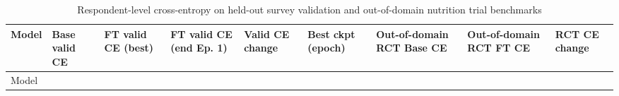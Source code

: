 \documentclass[
  letterpaper,
  DIV=11,
  numbers=noendperiod]{scrartcl}
\begin{document}
\begin{longtable}[]{@{}
  >{\raggedright\arraybackslash}p{}
  >{\raggedleft\arraybackslash}p{}
  >{\raggedleft\arraybackslash}p{}
  >{\raggedleft\arraybackslash}p{}
  >{\raggedleft\arraybackslash}p{}
  >{\raggedleft\arraybackslash}p{}
  >{\raggedleft\arraybackslash}p{}
  >{\raggedleft\arraybackslash}p{}
  >{\raggedleft\arraybackslash}p{}@{}}
\caption{Respondent-level cross-entropy on held-out survey validation
and out-of-domain nutrition trial
benchmarks}\label{tbl-validation}\tabularnewline
\toprule\noalign{}
\begin{minipage}[b]{\linewidth}\raggedright
Model
\end{minipage} & \begin{minipage}[b]{\linewidth}\raggedleft
Base valid CE
\end{minipage} & \begin{minipage}[b]{\linewidth}\raggedleft
FT valid CE (best)
\end{minipage} & \begin{minipage}[b]{\linewidth}\raggedleft
FT valid CE (end Ep. 1)
\end{minipage} & \begin{minipage}[b]{\linewidth}\raggedleft
Valid CE change
\end{minipage} & \begin{minipage}[b]{\linewidth}\raggedleft
Best ckpt (epoch)
\end{minipage} & \begin{minipage}[b]{\linewidth}\raggedleft
Out-of-domain RCT Base CE
\end{minipage} & \begin{minipage}[b]{\linewidth}\raggedleft
Out-of-domain RCT FT CE
\end{minipage} & \begin{minipage}[b]{\linewidth}\raggedleft
RCT CE change
\end{minipage} \\
\midrule\noalign{}
\endfirsthead
\toprule\noalign{}
\begin{minipage}[b]{\linewidth}\raggedright
Model
\end{minipage} & \begin{minipage}[b]{\linewidth}\raggedleft

\end{minipage}
\end{longtable}
\end{document}

